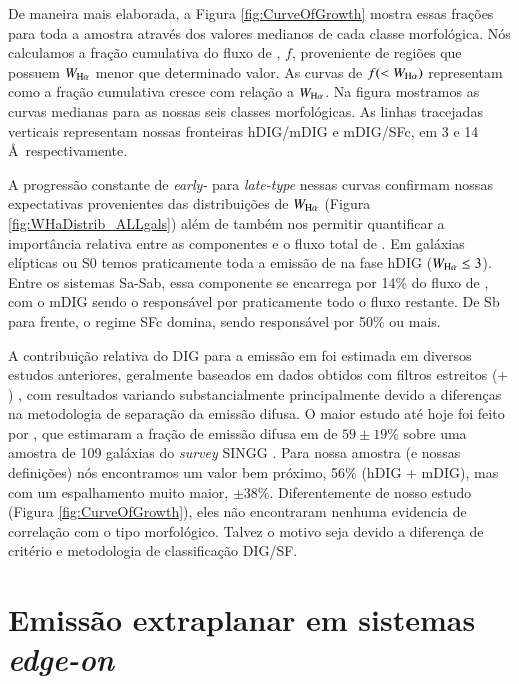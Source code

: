 De maneira mais elaborada, a Figura \ref{fig:CurveOfGrowth} mostra essas frações para toda a amostra através dos valores medianos de cada classe morfológica. Nós calculamos a fração cumulativa do fluxo de \Ha, $f$, proveniente de regiões que possuem $W_{\Ha}$ menor que determinado valor. As curvas de $f(<W_{\Ha})$ representam como a fração cumulativa cresce com relação a $W_{\Ha}$. Na figura mostramos as curvas medianas para as nossas seis classes morfológicas. As linhas tracejadas verticais representam nossas fronteiras hDIG/mDIG e mDIG/SFc, em 3 e 14 \AA\ respectivamente.

A progressão constante de {\em early-} para {\em late-type} nessas curvas confirmam nossas expectativas provenientes das distribuições de $W_{\Ha}$ (Figura \ref{fig:WHaDistrib_ALLgals}) além de também nos permitir quantificar a importância relativa entre as componentes e o fluxo total de \Ha. Em galáxias elípticas ou S0 temos praticamente toda a emissão de \Ha na fase hDIG ($W_{\Ha} \le 3$). Entre os sistemas Sa-Sab, essa componente se encarrega por 14\% do fluxo de \Ha, com o mDIG sendo o responsável por praticamente todo o fluxo restante. De Sb para frente, o regime SFc domina, sendo responsável por 50\% ou mais.

A contribuição relativa do DIG para a emissão em \Ha foi estimada em diversos estudos anteriores, geralmente baseados em dados obtidos com filtros estreitos (\Ha + \nii) \citep{Ferguson.etal.1996, Zurita.etal.2000, Thilker.etal.2002, Oey.etal.2007}, com resultados variando substancialmente principalmente devido a diferenças na metodologia de separação da emissão difusa. O maior estudo até hoje foi feito por \citet{Oey.etal.2007}, que estimaram a fração de emissão difusa em \Ha de $59\pm19 \%$ sobre uma amostra de 109 galáxias do {\em survey} SINGG \citep{Meurer.etal.2006}. Para nossa amostra (e nossas definições) nós encontramos um valor bem próximo, 56\% (hDIG + mDIG), mas com um espalhamento muito maior, $\pm38 \%$. Diferentemente de nosso estudo (Figura \ref{fig:CurveOfGrowth}), eles não encontraram nenhuma evidencia de correlação com o tipo morfológico. Talvez o motivo seja devido a diferença de critério e metodologia de classificação DIG/SF.


\section{Emissão extraplanar em sistemas {\em edge-on}}
\label{sec:DIGdisc:edgeon}

